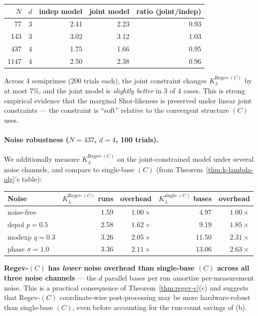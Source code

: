 \documentclass[11pt]{article}
\begin{document}
\begin{center}
\begin{tabular}{rrrrr}
\toprule
$N$ & $d$ & indep model & joint model & ratio (joint/indep) \\
\midrule
  77 & 3 & 2.41 & 2.23 & 0.93 \\
 143 & 3 & 3.02 & 3.12 & 1.03 \\
 437 & 4 & 1.75 & 1.66 & 0.95 \\
1147 & 4 & 2.50 & 2.38 & 0.96 \\
\bottomrule
\end{tabular}
\end{center}

Across 4 semiprimes (200 trials each), the joint constraint changes $K_\lambda^{\text{Regev-}(C)}$ by at most 7\%, and the joint model is \emph{slightly better} in 3 of 4 cases. This is strong empirical evidence that the marginal Shor-likeness is preserved under linear joint constraints --- the constraint is ``soft'' relative to the convergent structure $(C)$ uses.

\paragraph{Noise robustness ($N = 437$, $d = 4$, 100 trials).} We additionally measure $K_\lambda^{\text{Regev-}(C)}$ on the joint-constrained model under several noise channels, and compare to single-base $(C)$ (from Theorem~\ref{thm:k-lambda-alg}'s table):

\begin{center}
\begin{tabular}{lrrrr}
\toprule
Noise & $K_\lambda^{\text{Regev-}(C)}$ runs & overhead & $K_\lambda^{\text{single-}(C)}$ bases & overhead \\
\midrule
noise-free   & 1.59 & $1.00\times$ &  4.97 & $1.00\times$ \\
depol $p=0.5$& 2.58 & $1.62\times$ &  9.19 & $1.85\times$ \\
modexp $q=0.3$& 3.26 & $2.05\times$ & 11.50 & $2.31\times$ \\
phase $\sigma=1.0$ & 3.36 & $2.11\times$ & 13.06 & $2.63\times$ \\
\bottomrule
\end{tabular}
\end{center}

\noindent
\textbf{Regev-$(C)$ has \emph{lower} noise overhead than single-base $(C)$ across all three noise channels} --- the $d$ parallel bases per run amortize per-measurement noise. This is a practical consequence of Theorem~\ref{thm:regev-c}(c) and suggests that Regev-$(C)$ coordinate-wise post-processing may be more hardware-robust than single-base $(C)$, even before accounting for the run-count savings of (b).
\end{document}
